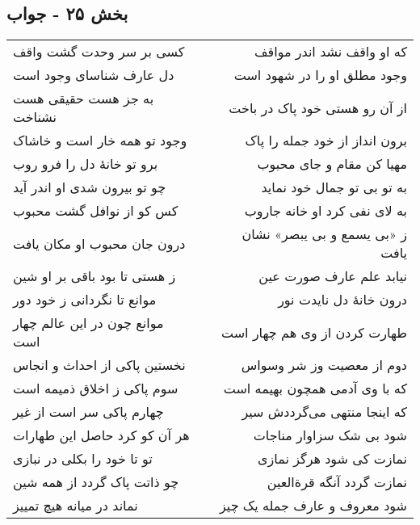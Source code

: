 \begin{center}
\section*{بخش ۲۵ - جواب}
\label{sec:sh025}
\begin{longtable}{l p{0.5cm} r}
کسی بر سر وحدت گشت واقف
&&
که او واقف نشد اندر مواقف
\\
دل عارف شناسای وجود است
&&
وجود مطلق او را در شهود است
\\
به جز هست حقیقی هست نشناخت
&&
از آن رو هستی خود پاک در باخت
\\
وجود تو همه خار است و خاشاک
&&
برون انداز از خود جمله را پاک
\\
برو تو خانهٔ دل را فرو روب
&&
مهیا کن مقام و جای محبوب
\\
چو تو بیرون شدی او اندر آید
&&
به تو بی تو جمال خود نماید
\\
کس کو از نوافل گشت محبوب
&&
به لای نفی کرد او خانه جاروب
\\
درون جان محبوب او مکان یافت
&&
ز «بی یسمع و بی یبصر» نشان یافت
\\
ز هستی تا بود باقی بر او شین
&&
نیابد علم عارف صورت عین
\\
موانع تا نگردانی ز خود دور
&&
درون خانهٔ دل نایدت نور
\\
موانع چون در این عالم چهار است
&&
طهارت کردن از وی هم چهار است
\\
نخستین پاکی از احداث و انجاس
&&
دوم از معصیت وز شر وسواس
\\
سوم پاکی ز اخلاق ذمیمه است
&&
که با وی آدمی همچون بهیمه است
\\
چهارم پاکی سر است از غیر
&&
که اینجا منتهی می‌گرددش سیر
\\
هر آن کو کرد حاصل این طهارات
&&
شود بی شک سزاوار مناجات
\\
تو تا خود را بکلی در نبازی
&&
نمازت کی شود هرگز نمازی
\\
چو ذاتت پاک گردد از همه شین
&&
نمازت گردد آنگه قرةالعین
\\
نماند در میانه هیچ تمییز
&&
شود معروف و عارف جمله یک چیز
\\
\end{longtable}
\end{center}
